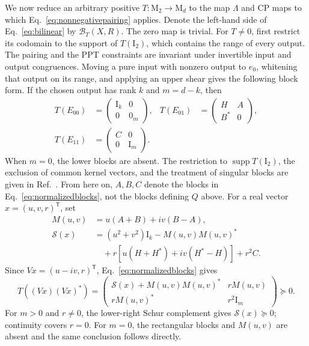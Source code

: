 \documentclass[aps,prl,reprint,superscriptaddress,nofootinbib]{revtex4-2}
\newcommand{\M}{\mathrm{M}}
\newcommand{\I}{\mathrm{I}}
\newcommand{\supp}{\operatorname{supp}}
\newcommand{\cB}{\mathcal B}
\newcommand{\cS}{\mathcal S}
\begin{document}
We now reduce an arbitrary positive $T:\M_2\to\M_d$ to the map $\Lambda$
and CP maps to which Eq.~\eqref{eq:nonnegativepairing} applies.  Denote the left-hand side of
Eq.~\eqref{eq:bilinear} by
$\cB_T(X,R)$.  The zero map is trivial.  For $T\neq0$, first restrict its
codomain to the support of $T(\I_2)$, which contains the range of every output.
The pairing and the PPT constraints are invariant under invertible input and
output congruences.  Moving a pure input with nonzero output to $e_0$,
whitening that output on its range, and applying an upper shear gives the
following block form.  If the chosen output has rank $k$ and $m=d-k$, then
\begin{equation}
 \begin{aligned}
 T(E_{00})&=\begin{pmatrix}\I_k&0\\0&0_m\end{pmatrix},&
 T(E_{01})&=\begin{pmatrix}H&A\\B^*&0\end{pmatrix},\\[-1mm]
 T(E_{11})&=\begin{pmatrix}C&0\\0&\I_m\end{pmatrix}.
 \end{aligned}
\label{eq:normalizedblocks}
\end{equation}
When $m=0$, the lower blocks are absent.  The restriction to
$\supp T(\I_2)$, the exclusion of common kernel vectors, and the treatment of
singular blocks are given in Ref.~\cite{Supplement}.  From here on, $A,B,C$
denote the blocks in Eq.~\eqref{eq:normalizedblocks}, not the blocks defining
$Q$ above.
For a real vector $x=(u,v,r)^{\mathsf T}$, set
\begin{align}
 M(u,v)&=u(A+B)+iv(B-A),
\nonumber\\
 \cS(x)&=(u^2+v^2)\I_k-M(u,v)M(u,v)^*
\nonumber\\[-1mm]
 &\quad+r\left[u(H+H^*)+iv(H^*-H)\right]+r^2C.
\label{eq:schurform}
\end{align}
Since $Vx=(u-iv,r)^{\mathsf T}$, Eq.~\eqref{eq:normalizedblocks} gives
\begin{equation}
 T((Vx)(Vx)^*)=
 \begin{pmatrix}
  \cS(x)+M(u,v)M(u,v)^*&rM(u,v)\\
  rM(u,v)^*&r^2\I_m
 \end{pmatrix}\succeq0.
\label{eq:pureoutputnormal}
\end{equation}
For $m>0$ and $r\neq0$, the lower-right Schur complement gives
$\cS(x)\succeq0$; continuity covers $r=0$.  For $m=0$, the rectangular
blocks and $M(u,v)$ are absent and the same conclusion follows directly.
\end{document}
